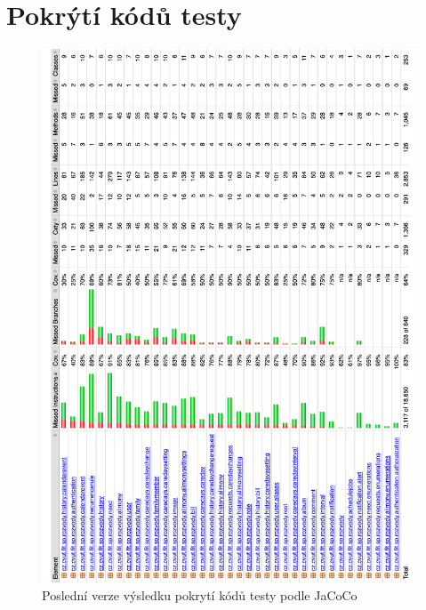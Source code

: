 \chapter{Pokrýtí kódů testy}\label{dodatek:code-coverage}
    \begin{figure}\centering
	    \includegraphics[width=1.0\textwidth]{pdfs/JaCoCo-results}
	    \caption[Pokrytí kódů testy podle JaCoCo]{Poslední verze výsledku pokrytí kódů testy podle JaCoCo}\label{image:jacoco-results}
    \end{figure}
